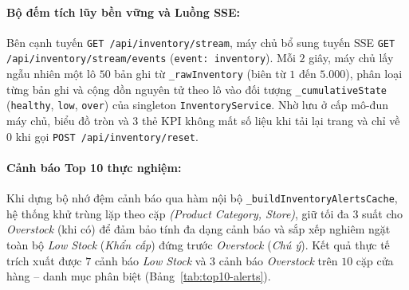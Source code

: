 \paragraph{Bộ đếm tích lũy bền vững và Luồng SSE:} Bên cạnh tuyến \texttt{GET /api/inventory/stream}, máy chủ bổ sung tuyến SSE \texttt{GET /api/inventory/stream/events} (\texttt{event: inventory}). Mỗi $2$ giây, máy chủ lấy ngẫu nhiên một lô $50$ bản ghi từ \texttt{\_rawInventory} (biên từ $1$ đến $5.000$), phân loại từng bản ghi và cộng dồn nguyên tử theo lô vào đối tượng \texttt{\_cumulativeState} (\texttt{healthy}, \texttt{low}, \texttt{over}) của singleton \texttt{InventoryService}. Nhờ lưu ở cấp mô-đun máy chủ, biểu đồ tròn và $3$ thẻ KPI không mất số liệu khi tải lại trang và chỉ về $0$ khi gọi \texttt{POST /api/inventory/reset}.

\paragraph{Cảnh báo Top 10 thực nghiệm:} Khi dựng bộ nhớ đệm cảnh báo qua hàm nội bộ \texttt{\_buildInventoryAlertsCache}, hệ thống khử trùng lặp theo cặp \textit{(Product Category, Store)}, giữ tối đa $3$ suất cho \textit{Overstock} (khi có) để đảm bảo tính đa dạng cảnh báo và sắp xếp nghiêm ngặt toàn bộ \textit{Low Stock} (\textit{Khẩn cấp}) đứng trước \textit{Overstock} (\textit{Chú ý}). Kết quả thực tế trích xuất được $7$ cảnh báo \textit{Low Stock} và $3$ cảnh báo \textit{Overstock} trên $10$ cặp cửa hàng -- danh mục phân biệt (Bảng~\ref{tab:top10-alerts}).


